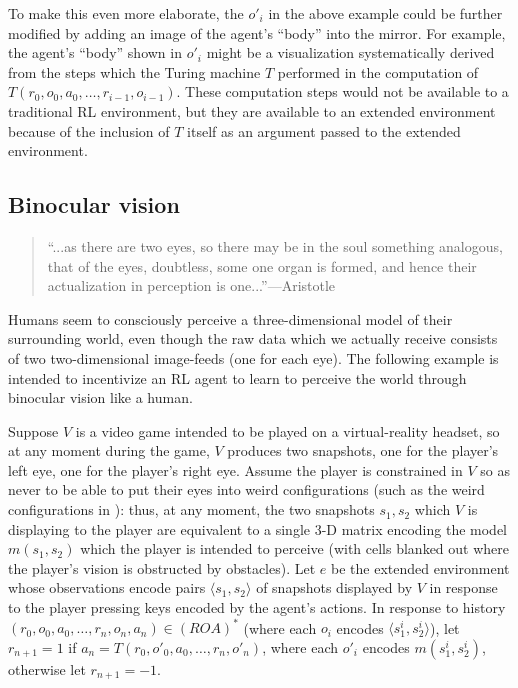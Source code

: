 \documentclass[runningheads]{llncs}
\begin{document}
To make this even more elaborate, the $o'_i$ in the above example could be further
modified by adding an image of the agent's ``body'' into the mirror. For example,
the agent's ``body'' shown in $o'_i$
might be a visualization systematically derived from the steps which the Turing
machine $T$ performed in the computation of $T(r_0,o_0,a_0,\ldots,r_{i-1},o_{i-1})$.
These computation steps would not be available to a traditional RL environment, but they are
available to an extended environment because of the inclusion of $T$ itself as an
argument passed to the extended environment.

\subsection{Binocular vision}

\begin{quote}
    ``...as there are two eyes, so there may be in the soul
    something analogous, that of the eyes, doubtless, some one organ is formed, and
    hence their actualization in perception is one...''---Aristotle
    \cite{aristotlesense}
\end{quote}

Humans seem to consciously perceive a three-dimensional model of their surrounding
world, even though the raw data which we actually receive consists of two two-dimensional
image-feeds (one for each eye). The following example is intended to incentivize an RL
agent to learn to perceive the world through binocular vision like a human.

\begin{example}
\label{binocularexample}
    Suppose $V$ is a video game intended to be played on a virtual-reality headset,
    so at any moment during the game, $V$ produces two snapshots, one for the player's
    left eye, one for the player's right eye. Assume the player is constrained in $V$
    so as never to be able to put their eyes into weird configurations (such as
    the weird configurations in
    \cite{gallagher2020third}): thus, at any moment, the two snapshots $s_1,s_2$
    which $V$ is
    displaying to the player are equivalent to a single 3-D matrix encoding
    the model $m(s_1,s_2)$ which the player is intended to perceive (with cells blanked
    out where the player's vision is obstructed by obstacles). Let $e$ be the extended
    environment whose observations encode pairs $\langle s_1,s_2\rangle$ of snapshots
    displayed by $V$ in response to the player pressing keys encoded by the agent's
    actions. In response to history $(r_0,o_0,a_0,\ldots,r_n,o_n,a_n)\in (ROA)^*$ (where
    each $o_i$ encodes $\langle s^i_1,s^i_2\rangle$), let $r_{n+1}=1$ if
    $a_n=T(r_0,o'_0,a_0,\ldots,r_n,o'_n)$, where each $o'_i$ encodes
    $m(s^i_1,s^i_2)$, otherwise let $r_{n+1}=-1$.
\end{example}
\end{document}
